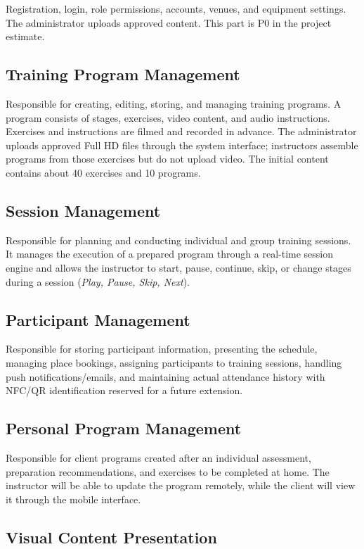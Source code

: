 \documentclass[a4paper,11pt]{article}
\begin{document}
Registration, login, role permissions, accounts, venues, and equipment settings. The administrator uploads approved content. This part is P0 in the project estimate.

\subsection{Training Program Management}

Responsible for creating, editing, storing, and managing training programs. A program consists of stages, exercises, video content, and audio instructions. Exercises and instructions are filmed and recorded in advance. The administrator uploads approved Full HD files through the system interface; instructors assemble programs from those exercises but do not upload video. The initial content contains about 40 exercises and 10 programs.

\subsection{Session Management}

Responsible for planning and conducting individual and group training sessions. It manages the execution of a prepared program through a real-time session engine and allows the instructor to start, pause, continue, skip, or change stages during a session (\textit{Play, Pause, Skip, Next}).

\subsection{Participant Management}

Responsible for storing participant information, presenting the schedule, managing place bookings, assigning participants to training sessions, handling push notifications/emails, and maintaining actual attendance history with NFC/QR identification reserved for a future extension.

\subsection{Personal Program Management}

Responsible for client programs created after an individual assessment, preparation recommendations, and exercises to be completed at home. The instructor will be able to update the program remotely, while the client will view it through the mobile interface.

\subsection{Visual Content Presentation}
\end{document}
